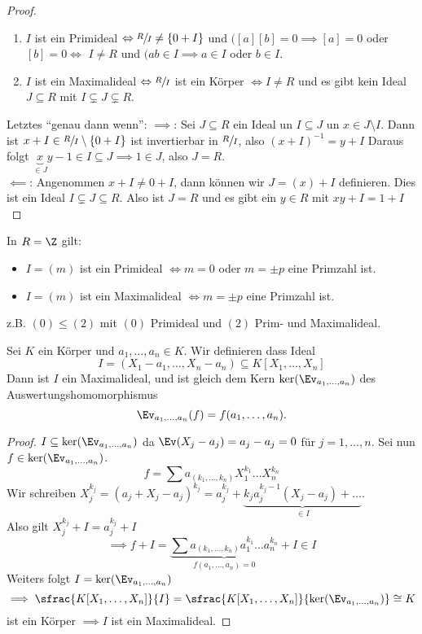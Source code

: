 \begin{proof}
	\begin{enumerate}[1)]
		\item $I$ ist ein Primideal $\Leftrightarrow \sfrac{R}{I} \neq \{0+I\} $ und $([ a ] [ b ] = 0 \implies [ a ] = 0$ oder $[ b ] = 0 \Leftrightarrow$
			$I \neq R$ und $(ab \in I \implies a \in I$ oder $b \in I$.
		\item $I$ ist ein Maximalideal $\Leftrightarrow \sfrac{R}{I}$ ist ein Körper $\Leftrightarrow I \neq R$ und es gibt kein Ideal $J \subseteq R$ mit 
			$I \subsetneq J \subsetneq R$.
	\end{enumerate}
	Letztes \enquote{genau dann wenn}: $\implies$: Sei  $J \subseteq R$ ein Ideal un $I \subseteq J$ un $x \in J \setminus I$. 
	Dann ist $x+I \in \sfrac{R}{I} \setminus \{0+I\} $ ist invertierbar
	in $\sfrac{R}{I}$, also $(x+I)^{-1} = y+I$ Daraus folgt $\underbrace{x}_{\in J}y -1 \in I \subseteq J \implies 1 \in J$, also $J = R$.\\
	$\impliedby$: Angenommen $x+I \neq  0+I$, dann können wir $J = (x)+I$ definieren.
	Dies ist ein Ideal $ I \subsetneq J \subseteq R$. Also ist $J = R$ und es gibt ein $y \in R$ mit $xy + I = 1 + I$
\end{proof}

\begin{eg}
	In $R = \Z$ gilt:
	\begin{itemize}
		\item $I =(m)$ ist ein Primideal $\Leftrightarrow m=0$ oder $m=\pm p$ eine Primzahl ist.
		\item $I=(m)$ ist ein Maximalideal $\Leftrightarrow m= \pm p$ eine Primzahl ist.
	\end{itemize}
	z.B. $(0) \leq (2) $ mit $(0)$ Primideal und $(2)$ Prim- und Maximalideal.
\end{eg}

\begin{eg}
	Sei $K$ ein Körper und $a_1,\ldots,a_{n} \in K$. Wir definieren dass Ideal 
	\[
		I = (X_1 - a_1,\ldots,X_{n} - a_{n}) \subseteq K[X_1,\ldots,X_{n}]
	\] 
	Dann ist $I$ ein Maximalideal, und ist gleich dem Kern $\ker(\Ev_{a_1,\ldots,a_{n}})$ des Auswertungshomomorphismus
	\[
		\Ev_{a_1,\ldots,a_{n}}(f) = f(a_1,\ldots,a_{n})
	.\] 
	\begin{proof}
	$I \subseteq \ker(\Ev_{a_1,\ldots,a_{n}})$ da $\Ev(X_{j} - a_{j}) = a_{j} - a_{j} = 0$ für $j = 1,\ldots,n$.
	Sei nun $f \in \ker(\Ev_{a_1,\ldots,a_{n}})$. 
	\[
		f = \sum a_{(k_1,\ldots,k_{n})} X_1^{k_1} \ldots X_{n}^{k_{n}}
	\]
	Wir schreiben $X_{j}^{k_{j}} = (a_{j} + X_{j} - a_{j})^{k_{j}} = a_{j}^{k_{j}} + \underbrace{k_{j} a_{j}^{k_{j}-1} (X_{j} - a_{j}) + \ldots}_{\in I}$.\\
	Also gilt $X_{j}^{k_{j}} + I = a_{j}^{k_{j}} + I$ 
	\[
		\implies f + I = \underbrace{\sum a_{(k_1,\ldots,k_{n})} a_1^{k_1}\ldots a_{n}^{k_{n}}}_{f(a_1,\ldots,a_{n}) = 0} + I \in I
	\]
	Weiters folgt $I = \ker(\Ev_{a_1,\ldots,a_{n}})$
	\[
		\implies \sfrac{K[X_1,\ldots,X_{n}]}{I} = \sfrac{K[X_1,\ldots,X_{n}]}{\ker(\Ev_{a_1,\ldots,a_{n}})} \cong K
	\]
	ist ein Körper $\implies I$ ist ein Maximalideal.
	\end{proof}
\end{eg}

